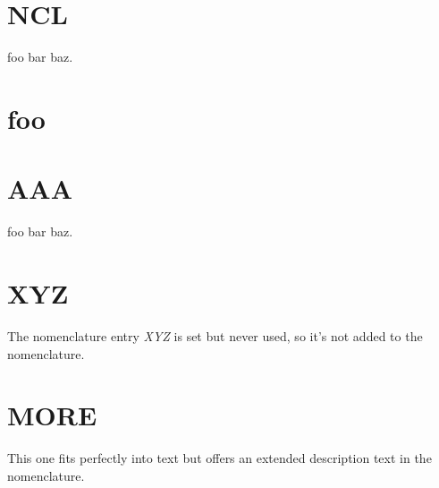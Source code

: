 \documentclass[12pt,oneside]{scrartcl}
\begin{document}
\printnomenclature
\newpage




\section{NCL}



foo bar  baz.

%

\section{foo}



%

\section{AAA}




foo bar  baz.

%

\section{XYZ}

The nomenclature entry \emph{XYZ} is set but never used, so it's not added to the nomenclature.

%

\section{MORE}

This one fits perfectly into text but offers an extended description text in the nomenclature.

\end{document}
